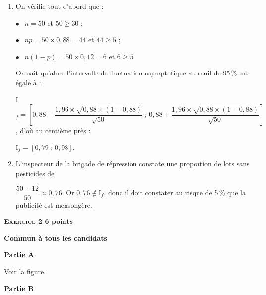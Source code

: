 \documentclass[10pt]{article}
\begin{document}
 
\begin{enumerate}
\item %
On vérifie tout d'abord que :

$\bullet~~$ $n = 50$ et $50 \geqslant 30$ ;

$\bullet~~$ $np = 50 \times 0,88 = 44$ et $44 \geqslant 5$ ;

$\bullet~~$ $n(1 - p) = 50 \times 0,12 = 6$ et $6 \geqslant 5$.

On sait qu'alors l'intervalle de fluctuation asymptotique au seuil de 95\,\% est égale à :

I$_{f} = \left[0,88 - \dfrac{1,96 \times \sqrt{0,88 \times (1 - 0,88)}}{\sqrt{50}}~;~0,88 + \dfrac{1,96 \times \sqrt{0,88 \times (1 - 0,88)}}{\sqrt{50}}\right]$, d'où au centième près :

I$_{f} = [0,79~;~0,98]$. 
\item %
L'inspecteur de la brigade de répression constate une proportion de lots sans pesticides de 

$\dfrac{50 - 12}{50} \approx 0,76$.
Or $0,76 \notin \text{I}_{f}$, donc il doit constater au risque de 5\,\% que la publicité est mensongère. 
\end{enumerate}
 
\vspace{0,5cm}

\textbf{\textsc{Exercice 2} \hfill 6 points}

\textbf{Commun  à tous les candidats} 

%
% 

\bigskip
 
\textbf{Partie A}

\medskip
  
Voir la figure. 

\bigskip
 
\textbf{Partie B}
\end{document}
